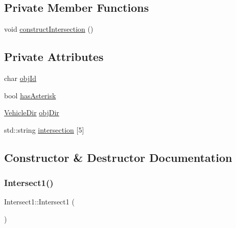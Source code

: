 \subsection*{Private Member Functions}
\begin{DoxyCompactItemize}
\item 
void \hyperlink{class_intersect1_a3a79b2e996c2016783b1402c55fdd031}{construct\+Intersection} ()
\end{DoxyCompactItemize}
\subsection*{Private Attributes}
\begin{DoxyCompactItemize}
\item 
char \hyperlink{class_intersect1_a56c8de0a332b6d6697bd2a90e5b6836c}{obj\+Id}
\item 
bool \hyperlink{class_intersect1_a4a6b71f9231c83a694bf8df031d0a89c}{has\+Asterisk}
\item 
\hyperlink{vehicle_8h_ab81942edaa6e6c3f12551c3d0e511b85}{Vehicle\+Dir} \hyperlink{class_intersect1_ab28ebc72d88ccb28b8be06b5d5899cc8}{obj\+Dir}
\item 
std\+::string \hyperlink{class_intersect1_ae1c091719803a8e8dbc8103d826a7f77}{intersection} \mbox{[}5\mbox{]}
\end{DoxyCompactItemize}


\subsection{Constructor \& Destructor Documentation}
\hypertarget{class_intersect1_a0c12979886e88742d97abd6589e5df46}{}\label{class_intersect1_a0c12979886e88742d97abd6589e5df46} 
\subsubsection{\texorpdfstring{Intersect1()}{Intersect1()}\hspace{0.1cm}{\footnotesize\ttfamily [1/2]}}
{\footnotesize\ttfamily Intersect1\+::\+Intersect1 (\begin{DoxyParamCaption}{ }\end{DoxyParamCaption})}

\hypertarget{class_intersect1_aafc6174c032f9d51a887cb290ae97fdc}{}\label{class_intersect1_aafc6174c032f9d51a887cb290ae97fdc} 
